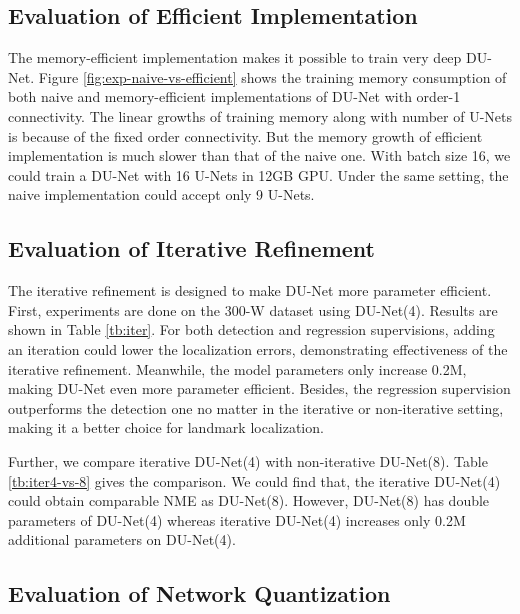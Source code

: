 \subsection{Evaluation of Efficient Implementation}

The memory-efficient implementation makes it possible to train very deep DU-Net. Figure \ref{fig:exp-naive-vs-efficient} shows the training memory consumption of both naive and memory-efficient implementations of DU-Net with order-1 connectivity. The linear growths of training memory along with number of U-Nets is because of the fixed order connectivity. But the memory growth of efficient implementation is much slower than that of the naive one. With batch size 16, we could train a DU-Net with 16 U-Nets in 12GB GPU. Under the same setting, the naive implementation could accept only 9 U-Nets.


\subsection{Evaluation of Iterative Refinement}
The iterative refinement is designed to make DU-Net more parameter efficient. First, experiments are done on the 300-W dataset using DU-Net(4). Results are shown in Table \ref{tb:iter}. For both detection and regression supervisions, adding an iteration could lower the localization errors, demonstrating effectiveness of the iterative refinement. Meanwhile, the model parameters only increase 0.2M, making DU-Net even more parameter efficient. Besides, the regression supervision outperforms the detection one no matter in the iterative or non-iterative setting, making it a better choice for landmark localization. 

Further, we compare iterative DU-Net(4) with non-iterative DU-Net(8). Table \ref{tb:iter4-vs-8} gives the comparison. We could find that, the iterative DU-Net(4) could obtain comparable NME as DU-Net(8). However, DU-Net(8) has double parameters of  DU-Net(4) whereas iterative DU-Net(4) increases only 0.2M additional parameters on DU-Net(4).


\subsection{Evaluation of Network Quantization}

